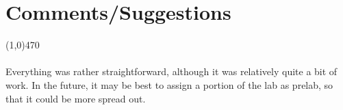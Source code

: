 \documentclass[12pt]{article}
\begin{document}
 \section{Comments/Suggestions}\vspace{-.7cm} \line(1,0){470}
 	\paragraph{}
		Everything was rather straightforward, although it was relatively quite a bit of work. In the future, it may be best to assign a portion of the lab as prelab, so that it could be more spread out.
		
\end{document}
